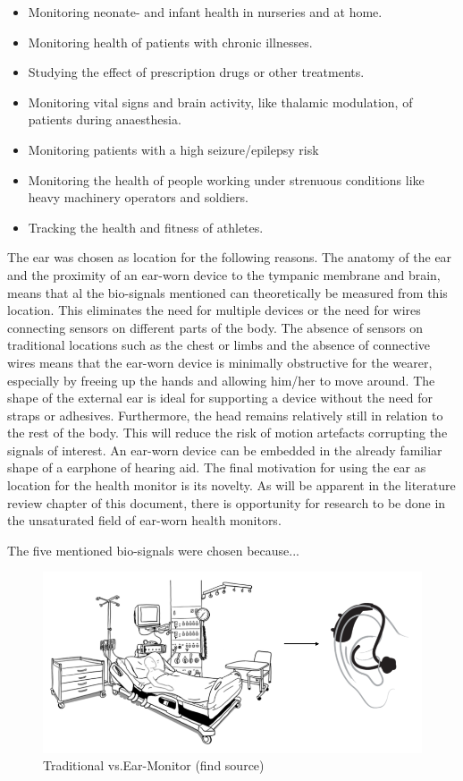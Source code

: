 \begin{itemize}
\item Monitoring neonate- and infant health in nurseries and at home.
\item Monitoring health of patients with chronic illnesses.
\item Studying the effect of prescription drugs or other treatments.
\item Monitoring vital signs and brain activity, like thalamic modulation, of patients during anaesthesia.
\item Monitoring patients with a high seizure/epilepsy risk
\item Monitoring the health of people working under strenuous conditions like heavy machinery operators and soldiers.
\item Tracking the health and fitness of athletes.
\end{itemize}

The ear was chosen as location for the following reasons. The anatomy of the ear and the proximity of an ear-worn device to the tympanic membrane and brain, means that al the bio-signals mentioned can theoretically be measured from this location. This eliminates the need for multiple devices or the need for wires connecting sensors on different parts of the body. The absence of sensors on traditional locations such as the chest or limbs and the absence of connective wires means that the ear-worn device is minimally obstructive for the wearer, especially by freeing up the hands and allowing him/her to move around. The shape of the external ear is ideal for supporting a device without the need for straps or adhesives. Furthermore, the head remains relatively still in relation to the rest of the body. This will reduce the risk of motion artefacts corrupting the signals of interest. An ear-worn device can be embedded in the already familiar shape of a earphone of hearing aid. The final motivation for using the ear as location for the health monitor is its novelty. As will be apparent in the literature review chapter of this document, there is opportunity for research to be done in the unsaturated field of ear-worn health monitors.

The five mentioned bio-signals were chosen because...

\begin{figure}[h]
   \centering
   \includegraphics[scale=0.4]{figs/TraditionalICU}
   \caption{Traditional vs.Ear-Monitor (find source)}
   \label{fig:TraditionalICU}
\end{figure}